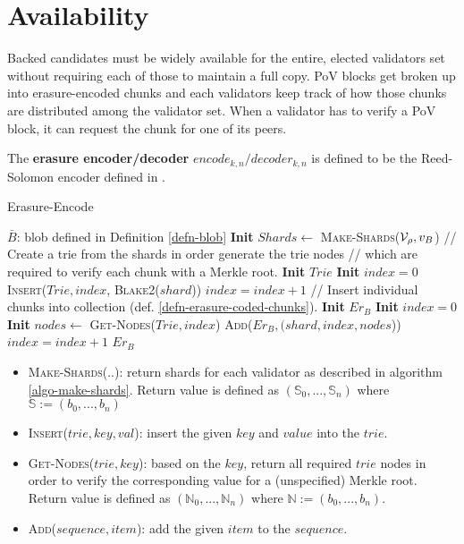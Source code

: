 \section{Availability}

Backed candidates must be widely available for the entire, elected validators
set without requiring each of those to maintain a full copy. PoV blocks get
broken up into erasure-encoded chunks and each validators keep track of how
those chunks are distributed among the validator set. When a validator has to
verify a PoV block, it can request the chunk for one of its peers.

\begin{definition}
  \label{defn-erasure-encoder-decoder}
  The {\bf erasure encoder/decoder} {\bf $encode_{k,n}/decoder_{k,n}$ } is
  defined to be the Reed-Solomon encoder defined in \cite{??}.
\end{definition}

\begin{algorithm}[H]
  \caption[]{\sc Erasure-Encode}
  \label{algo-erasure-encode}
  \begin{algorithmic}[1]
    \Require
    $\bar{B}$: blob defined in Definition \ref{defn-blob}
    \State \textbf{Init} $Shards \leftarrow$ \textsc{Make-Shards}($\mathcal{V}_\rho, v_B$)
    \Statex
    \Statex // Create a trie from the shards in order generate the trie nodes
    \Statex // which are required to verify each chunk with a Merkle root.
    \State \textbf{Init} $Trie$
    \State \textbf{Init} $index = 0$
      \State \textsc{Insert}($Trie,index$, \textsc{Blake2}($shard$))
      \State $index = index + 1$
    \EndFor
    \Statex
    \Statex // Insert individual chunks into collection (def. \ref{defn-erasure-coded-chunks}).
    \State \textbf{Init} $Er_B$
    \State \textbf{Init} $index = 0$
      \State \textbf{Init} $nodes \leftarrow$ \textsc{Get-Nodes}($Trie, index$)
      \State \textsc{Add}($Er_B, (shard, index, nodes$))
      \State $index = index + 1$
    \EndFor
    \Statex
    \State \Return $Er_B$
  \end{algorithmic}
\end{algorithm}

\begin{itemize}
  \item \textsc{Make-Shards(..)}: return shards for each validator as described
  in algorithm \ref{algo-make-shards}. Return value is defined as
  $(\mathbb{S}_0,...,\mathbb{S}_n)$ where $\mathbb{S} := (b_0,...,b_n)$
  \item \textsc{Insert($trie,key,val$)}: insert the given $key$ and $value$ into
  the $trie$.
  \item \textsc{Get-Nodes($trie,key$)}: based on the $key$, return all required
  $trie$ nodes in order to verify the corresponding value for a (unspecified)
  Merkle root. Return value is defined as $(\mathbb{N}_0,...,\mathbb{N}_n)$
  where $\mathbb{N} := (b_0,...,b_n)$.
  \item \textsc{Add($sequence, item$)}: add the given $item$ to the $sequence$.
\end{itemize}


